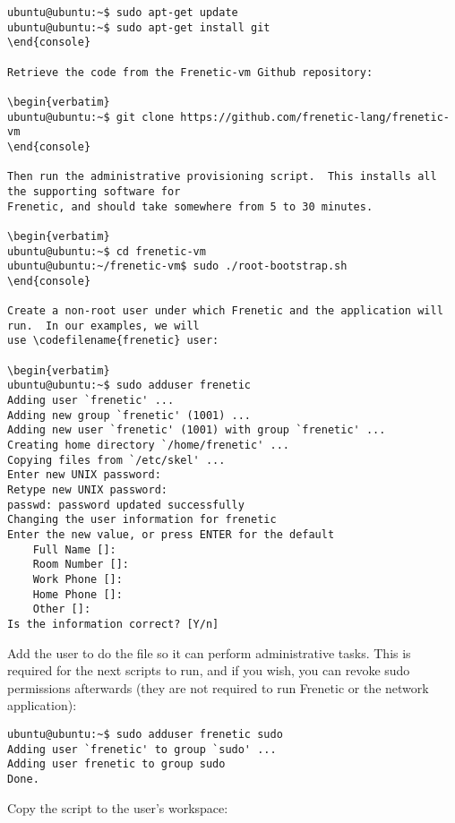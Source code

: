 \begin{verbatim}
ubuntu@ubuntu:~$ sudo apt-get update
ubuntu@ubuntu:~$ sudo apt-get install git
\end{console}

Retrieve the code from the Frenetic-vm Github repository:

\begin{verbatim}
ubuntu@ubuntu:~$ git clone https://github.com/frenetic-lang/frenetic-vm
\end{console}

Then run the administrative provisioning script.  This installs all the supporting software for 
Frenetic, and should take somewhere from 5 to 30 minutes.

\begin{verbatim}
ubuntu@ubuntu:~$ cd frenetic-vm
ubuntu@ubuntu:~/frenetic-vm$ sudo ./root-bootstrap.sh 
\end{console}

Create a non-root user under which Frenetic and the application will run.  In our examples, we will
use \codefilename{frenetic} user:

\begin{verbatim}
ubuntu@ubuntu:~$ sudo adduser frenetic
Adding user `frenetic' ...
Adding new group `frenetic' (1001) ...
Adding new user `frenetic' (1001) with group `frenetic' ...
Creating home directory `/home/frenetic' ...
Copying files from `/etc/skel' ...
Enter new UNIX password:
Retype new UNIX password:
passwd: password updated successfully
Changing the user information for frenetic
Enter the new value, or press ENTER for the default
	Full Name []:
	Room Number []:
	Work Phone []:
	Home Phone []:
	Other []:
Is the information correct? [Y/n]
\end{verbatim}

Add the  user to do the  file so it can perform administrative
tasks.  This is required for the next scripts to run, and if you wish, you can revoke sudo permissions
afterwards (they are not required to run Frenetic or the network application):

\begin{verbatim}
ubuntu@ubuntu:~$ sudo adduser frenetic sudo
Adding user `frenetic' to group `sudo' ...
Adding user frenetic to group sudo
Done.
\end{verbatim}

Copy the  script to the  user's workspace:

